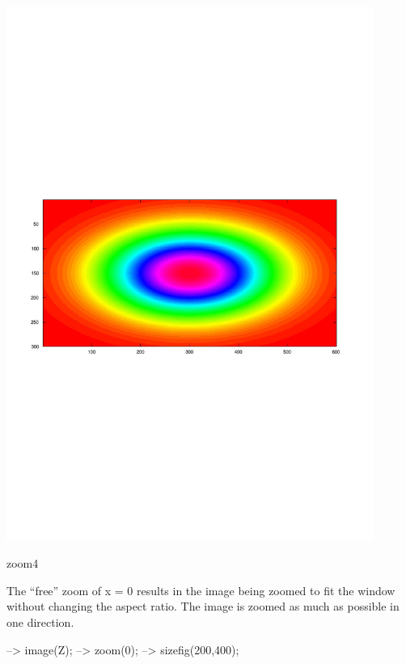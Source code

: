  
\begin{DoxyImage}
\includegraphics[width=12cm]{zoom4}
\caption{zoom4}
\end{DoxyImage}


The ``free'' zoom of {\ttfamily x = 0} results in the image being zoomed to fit the window without changing the aspect ratio. The image is zoomed as much as possible in one direction.


\begin{DoxyVerbInclude}
--> image(Z);
--> zoom(0);
--> sizefig(200,400);
\end{DoxyVerbInclude}


